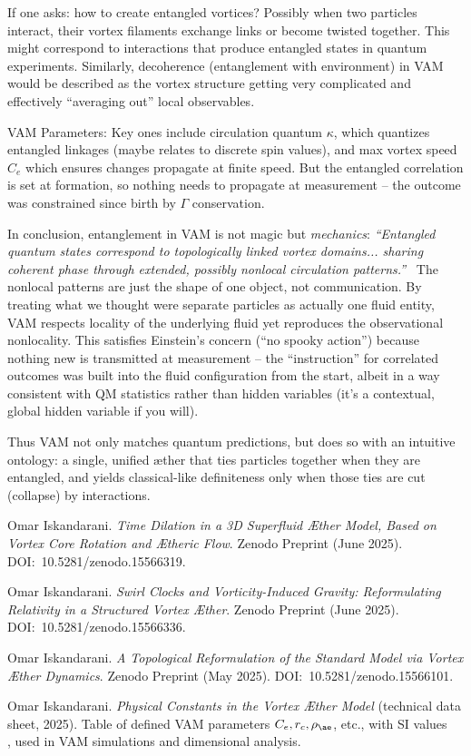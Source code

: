 \documentclass[a4paper, aps,preprint,superscriptaddress, 12pt]{revtex4}
\begin{document}
If one asks: how to create entangled vortices? Possibly when two particles interact, their vortex filaments exchange links or become twisted together. This might correspond to interactions that produce entangled states in quantum experiments. Similarly, decoherence (entanglement with environment) in VAM would be described as the vortex structure getting very complicated and effectively “averaging out” local observables.


VAM Parameters: Key ones include circulation quantum $\kappa$, which quantizes entangled linkages (maybe relates to discrete spin values), and max vortex speed $C_e$ which ensures changes propagate at finite speed. But the entangled correlation is set at formation, so nothing needs to propagate at measurement – the outcome was constrained since birth by $\Gamma$ conservation.


In conclusion, entanglement in VAM is not magic but \textit{mechanics}: \textit{“Entangled quantum states correspond to topologically linked vortex domains... sharing coherent phase through extended, possibly nonlocal circulation patterns.”}~\cite{Iskandarani2025c}  The nonlocal patterns are just the shape of one object, not communication. By treating what we thought were separate particles as actually one fluid entity, VAM respects locality of the underlying fluid yet reproduces the observational nonlocality. This satisfies Einstein’s concern (“no spooky action”) because nothing new is transmitted at measurement – the “instruction” for correlated outcomes was built into the fluid configuration from the start, albeit in a way consistent with QM statistics rather than hidden variables (it’s a contextual, global hidden variable if you will).


Thus VAM not only matches quantum predictions, but does so with an intuitive ontology: a single, unified æther that ties particles together when they are entangled, and yields classical-like definiteness only when those ties are cut (collapse) by interactions.



\begin{thebibliography}{99}


 Omar Iskandarani. \textit{Time Dilation in a 3D Superfluid Æther Model, Based on Vortex Core Rotation and Ætheric Flow}. Zenodo Preprint (June 2025). DOI:~10.5281/zenodo.15566319.


 Omar Iskandarani. \textit{Swirl Clocks and Vorticity-Induced Gravity: Reformulating Relativity in a Structured Vortex Æther}. Zenodo Preprint (June 2025). DOI:~10.5281/zenodo.15566336.


 Omar Iskandarani. \textit{A Topological Reformulation of the Standard Model via Vortex Æther Dynamics}. Zenodo Preprint (May 2025). DOI:~10.5281/zenodo.15566101.


 Omar Iskandarani. \textit{Physical Constants in the Vortex Æther Model} (technical data sheet, 2025). Table of defined VAM parameters $C_e, r_c, \rho_{\ae}$, etc., with SI values~\cite{VAM_constants} ~\cite{VAM_constants} , used in VAM simulations and dimensional analysis.


\end{thebibliography}
\end{document}
